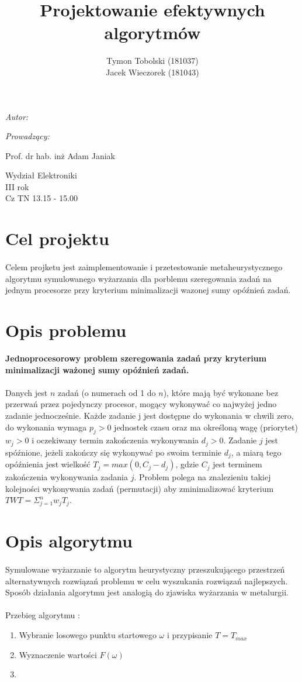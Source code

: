 \documentclass[wide,a4paper,titlepage,12pt] {article}
\title{Projektowanie efektywnych algorytmów}
\author{Tymon Tobolski (181037)\\ Jacek Wieczorek (181043)}
\makeatletter
\renewcommand{\maketitle}{
\begin{titlepage}
  \begin{center}
    \vspace*{3cm}
    \LARGE \@title \par
    \vspace{2cm}
    \textit{\small Autor:}\par
    \normalsize \@author\par \normalsize
    \vspace{3cm}
    \textit{\small Prowadzący:}\par
   Prof. dr hab. inż Adam Janiak \par
    \vspace{2cm}
    Wydział Elektroniki\\ III rok\\ Cz TN 13.15 - 15.00\par
    \vspace{4cm}
    \small \@date
  \end{center}
\end{titlepage}
}
\makeatother
\begin{document}
\maketitle
  \section{Cel projektu}
\paragraph{}
Celem projketu jest zaimplementowanie i przetestowanie metaheurystycznego algorytmu symulowanego wyżarzania dla porblemu szeregowania zadań na jednym procesorze przy kryterium minimalizacji wazonej sumy opóźnień zadań.
  \section{Opis problemu}
{\bf Jednoprocesorowy problem szeregowania zadań przy kryterium
minimalizacji ważonej sumy opóźnień zadań.}
\paragraph{}
Danych jest $n$ zadań (o numerach od 1 do $n$), które mają być wykonane bez przerwań przez pojedynczy procesor, mogący wykonywać co najwyżej jedno zadanie jednocześnie.
Każde zadanie j jest dostępne do wykonania w chwili zero, do wykonania wymaga $p_{j} > 0$ jednostek czasu oraz ma określoną wagę (priorytet) $w_{j} > 0$ i oczekiwany termin zakończenia
wykonywania $d_{j} > 0$. Zadanie $j$ jest spóźnione, jeżeli zakończy się wykonywać po swoim terminie $d_{j}$, a miarą tego opóźnienia jest wielkość $T_{j} = max(0, C_{j} - d_{j} )$, gdzie $C_{j}$ jest terminem zakończenia
wykonywania zadania $j$. Problem polega na znalezieniu takiej kolejności wykonywania zadań (permutacji) aby zminimalizować kryterium $TWT = \Sigma_{j=1}^{n} w_{j} T_{j}$.
\section{Opis algorytmu}
\paragraph{}
Symulowane wyżarzanie to algorytm heurystyczny przeszukującego przestrzeń alternatywnych rozwiązań problemu w celu wyszukania rozwiązań najlepszych. Sposób działania algorytmu jest analogią do zjawiska wyżarzania w metalurgii.
\paragraph{}
Przebieg algorytmu :
\begin{enumerate}
  \item Wybranie losowego punktu startowego $\omega$ i przypisanie $T = T_{max}$
  \item Wyznaczenie wartości $F(\omega)$
  \item 
\end{enumerate}	
\end{document}
